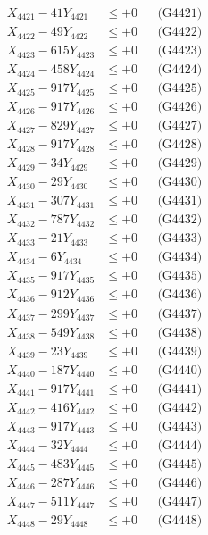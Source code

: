 \documentclass[a4paper,10pt]{article}
\begin{document}
{\begin{align}
\allowbreak
X_{4421} - 41Y_{4421} &\leq +0 && \text{(G4421)} \\
X_{4422} - 49Y_{4422} &\leq +0 && \text{(G4422)} \\
X_{4423} - 615Y_{4423} &\leq +0 && \text{(G4423)} \\
X_{4424} - 458Y_{4424} &\leq +0 && \text{(G4424)} \\
X_{4425} - 917Y_{4425} &\leq +0 && \text{(G4425)} \\
X_{4426} - 917Y_{4426} &\leq +0 && \text{(G4426)} \\
X_{4427} - 829Y_{4427} &\leq +0 && \text{(G4427)} \\
X_{4428} - 917Y_{4428} &\leq +0 && \text{(G4428)} \\
X_{4429} - 34Y_{4429} &\leq +0 && \text{(G4429)} \\
X_{4430} - 29Y_{4430} &\leq +0 && \text{(G4430)} \\
\allowbreak
X_{4431} - 307Y_{4431} &\leq +0 && \text{(G4431)} \\
X_{4432} - 787Y_{4432} &\leq +0 && \text{(G4432)} \\
X_{4433} - 21Y_{4433} &\leq +0 && \text{(G4433)} \\
X_{4434} - 6Y_{4434} &\leq +0 && \text{(G4434)} \\
X_{4435} - 917Y_{4435} &\leq +0 && \text{(G4435)} \\
X_{4436} - 912Y_{4436} &\leq +0 && \text{(G4436)} \\
X_{4437} - 299Y_{4437} &\leq +0 && \text{(G4437)} \\
X_{4438} - 549Y_{4438} &\leq +0 && \text{(G4438)} \\
X_{4439} - 23Y_{4439} &\leq +0 && \text{(G4439)} \\
X_{4440} - 187Y_{4440} &\leq +0 && \text{(G4440)} \\
\allowbreak
X_{4441} - 917Y_{4441} &\leq +0 && \text{(G4441)} \\
X_{4442} - 416Y_{4442} &\leq +0 && \text{(G4442)} \\
X_{4443} - 917Y_{4443} &\leq +0 && \text{(G4443)} \\
X_{4444} - 32Y_{4444} &\leq +0 && \text{(G4444)} \\
X_{4445} - 483Y_{4445} &\leq +0 && \text{(G4445)} \\
X_{4446} - 287Y_{4446} &\leq +0 && \text{(G4446)} \\
X_{4447} - 511Y_{4447} &\leq +0 && \text{(G4447)} \\
X_{4448} - 29Y_{4448} &\leq +0 && \text{(G4448)} \\

\end{align}}
\end{document}
